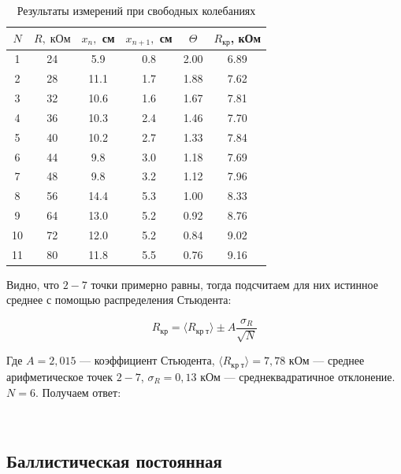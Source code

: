 \documentclass[12pt]{kiarticle}
\begin{document}
\begin{table}[h]
	\centering
	\caption{Результаты измерений при свободных колебаниях}
	\begin{tabular}{|c|c|c|c|c|c|}
		\hline
		$ N $& $ R, \; кОм $& $ x_n, $ см &$ x_{n+1}, $ см & $ \Theta $ & $ R_{кр} $, кОм\\
		\hline
		1 & 24 & 5.9 & 0.8 & 2.00 & 6.89 \\
		2 & 28 & 11.1 & 1.7 & 1.88 & 7.62 \\
		3 & 32 & 10.6 & 1.6 & 1.67 & 7.81 \\
		4 & 36 & 10.3 & 2.4 & 1.46 & 7.70 \\
		5 & 40 & 10.2 & 2.7 & 1.33 & 7.84 \\
		6 & 44 & 9.8 & 3.0 & 1.18 & 7.69 \\
		7 & 48 & 9.8 & 3.2 & 1.12 & 7.96 \\
		8 & 56 & 14.4 & 5.3 & 1.00 & 8.33 \\
		9 & 64 & 13.0 & 5.2 & 0.92 & 8.76 \\
		10 & 72 & 12.0 & 5.2 & 0.84 & 9.02 \\
		11 & 80 & 11.8 & 5.5 & 0.76 & 9.16 \\
		\hline
	\end{tabular}%
	\label{resR}%
\end{table}%

Видно, что $ 2-7 $ точки примерно равны, тогда подсчитаем для них истинное среднее с помощью распределения Стьюдента: 

\begin{equation}\label{}
R_{кр} = \langle R_{кр \; т}\rangle \pm A \dfrac{\sigma_R}{\sqrt{N}}
\end{equation} 

Где $ A = 2,015 $ --- коэффициент Стьюдента, $   \langle R_{кр \; т}\rangle = 7,78 $ кОм --- среднее арифметическое точек $ 2-7 $, $ \sigma_R  = 0,13 $ кОм --- среднеквадратичное отклонение. $ N = 6 $. Получаем ответ: 

	 \begin{center}
	{} \\
\end{center} 

\subsection{Баллистическая постоянная}
\end{document}
